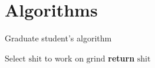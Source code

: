 \documentclass[11pt]{article}
\begin{document}
\section{Algorithms}

\begin{algorithm}
\caption{Graduate student’s algorithm}\label{euclid}
\begin{algorithmic}[1]
   \State Select $\mathrm{shit}$ to work on
      \State $\mathrm{grind}$
   \EndWhile
   \State \textbf{return} $\mathrm{shit}$
\EndProcedure
\end{algorithmic}
\end{algorithm}

% 

\end{document}
